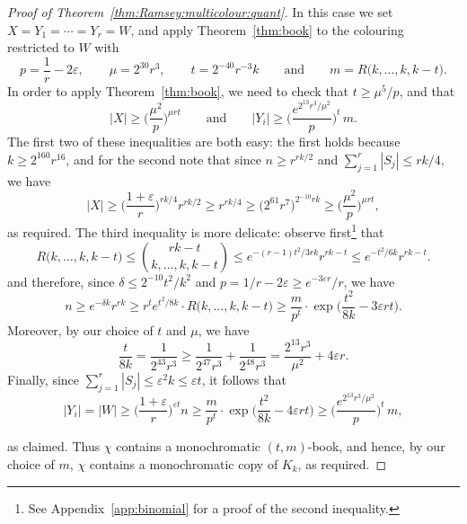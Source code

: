 \documentclass[12pt,reqno]{amsart}
\theoremstyle{definition}
\theoremstyle{remark}
\newcommand\eps{\varepsilon}
\renewcommand{\le}{\leqslant}
\renewcommand{\ge}{\geqslant}
\def\eps{\varepsilon}
\begin{document}
\begin{proof}[Proof of Theorem~\ref{thm:Ramsey:multicolour:quant}]
	In this case we set \(X = Y_1 = \cdots = Y_r = W\), and apply Theorem~\ref{thm:book} to the colouring restricted to \(W\) with
	\begin{equation*}
		p = \frac{1}{r} - 2\eps, \qquad \mu = 2^{30} r^3, \qquad t = 2^{-40} r^{-3} k \qquad \text{and} \qquad m = R\big( k, \ldots, k, k - t \big).
	\end{equation*}
	In order to apply Theorem~\ref{thm:book}, we need to check that \(t \ge \mu^5/p\), and that
	\begin{equation*}
		|X| \ge \bigg( \frac{\mu^2}{p} \bigg)^{\mu r t} \qquad \text{and} \qquad |Y_i| \ge \bigg( \frac{e^{2^{13} r^3 / \mu^2}}{p} \bigg)^t \, m.
	\end{equation*}
	The first two of these inequalities are both easy: the first holds because \(k \ge 2^{160} r^{16}\), and for the second note that since \(n \ge r^{rk/2}\) and \(\sum_{j = 1}^r |S_j| \le rk/4\), we have
	\begin{equation*}
		|X| \ge \bigg( \frac{1+\eps}{r} \bigg)^{rk/4} r^{rk/2} \ge r^{rk/4} \ge \big( 2^{61} r^7 \big)^{2^{-10} r k} \ge \bigg( \frac{\mu^2}{p} \bigg)^{\mu r t},
	\end{equation*}
	as required. The third inequality is more delicate: observe first\footnote{See Appendix~\ref{app:binomial} for a proof of the second inequality.} that
	\begin{equation*}
		R\big( k, \ldots, k, k-t \big) \le \binom{rk-t}{k,\dots,k,k-t} \le e^{-(r-1)t^2/3rk} r^{rk-t} \le e^{-t^2/6k} r^{rk-t}.
	\end{equation*}
	and therefore, since \(\delta \le 2^{-10} t^2/k^2\) and \(p = 1/r - 2\eps \ge e^{-3\eps r} / r\), we have
	\begin{equation*}
		n \ge e^{-\delta k} r^{rk} \ge r^t e^{t^2/8k} \cdot R\big( k, \ldots, k, k-t \big) \ge \frac{m}{p^t} \cdot \exp\bigg( \frac{t^2}{8k} - 3\eps r t \bigg).
	\end{equation*}
	Moreover, by our choice of \(t\) and \(\mu\), we have
	\begin{equation*}
		\frac{t}{8k} = \frac{1}{2^{43} r^3} \ge \frac{1}{2^{47}r^3} + \frac{1}{2^{48}r^3} = \frac{2^{13} r^3}{\mu^2} + 4\eps r.
	\end{equation*}
	Finally, since \(\sum_{j = 1}^r |S_j| \le \eps^2 k \le \eps t\), it follows that
	\begin{equation*}
		|Y_i| = |W| \ge \bigg( \frac{1+\eps}{r} \bigg)^{\eps t} n \ge \frac{m}{p^t} \cdot \exp\bigg( \frac{t^2}{8k} - 4\eps r t \bigg) \ge \bigg( \frac{e^{2^{13} r^3 / \mu^2}}{p} \bigg)^t \, m,
	\end{equation*}

	as claimed. Thus \(\chi\) contains a monochromatic \((t,m)\)-book, and hence, by our choice of \(m\), \(\chi\) contains a monochromatic copy of \(K_k\), as required.
\end{proof}
%
\end{document}
